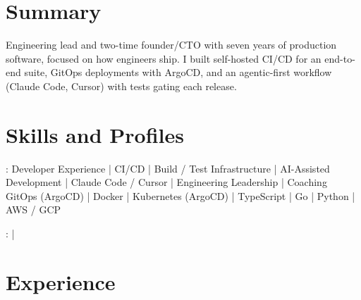 \documentclass[print]{jack-resume}
\begin{document}
\pagecolor{darkmodeBackground}


\begin{minipage}[t][1cm][t]{.03\textwidth}
    \hfill
\end{minipage}

\section{Summary}
Engineering lead and two-time founder/CTO with seven years of production software, focused on how engineers ship. I built self-hosted CI/CD for an end-to-end suite, GitOps deployments with ArgoCD, and an agentic-first workflow (Claude Code, Cursor) with tests gating each release.
\sectionsep

\section{Skills and Profiles}
:
Developer Experience \hfill | \hfill
CI/CD \hfill | \hfill
Build / Test Infrastructure \hfill | \hfill
AI-Assisted Development \hfill | \hfill
Claude Code / Cursor \hfill | \hfill
Engineering Leadership \hfill | \hfill
Coaching \\
\hspace{1.0cm} GitOps (ArgoCD) \hfill | \hfill
Docker \hfill | \hfill
Kubernetes (ArgoCD) \hfill | \hfill
TypeScript \hfill | \hfill
Go \hfill | \hfill
Python \hfill | \hfill
AWS / GCP \\

\raggedright{
    :
      \href{https://www.linkedin.com/in/jack-sturtevant/}{ \ExternalLink} |
     \href{https://github.com/jacksturt}{ \ExternalLink}}

\section{Experience}
\end{document}
